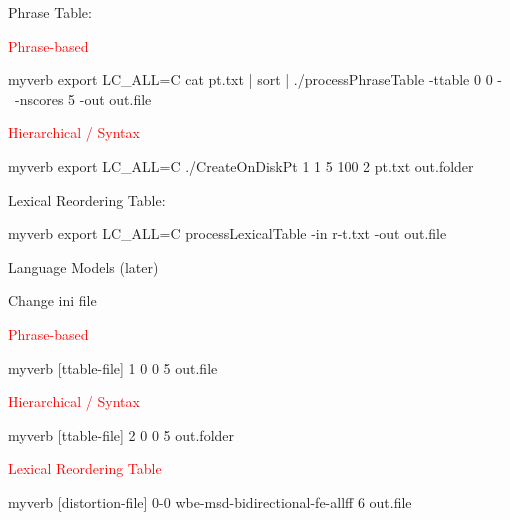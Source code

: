 \documentclass[landscape]{uedslides2C}
\begin{document}

 
Phrase Table:  
\begin{center}
\textcolor{red}{Phrase-based} \\
\begin{SaveVerbatim}{myverb} 
  export LC_ALL=C
  cat pt.txt | sort | ./processPhraseTable -ttable 0 0 -  \
      -nscores 5 -out out.file
\end{SaveVerbatim}
\colorbox{gray}{}
\end{center}

\begin{center}
\textcolor{red}{Hierarchical / Syntax} \\
\begin{SaveVerbatim}{myverb} 
  export LC_ALL=C
  ./CreateOnDiskPt 1 1 5 100 2 pt.txt out.folder
\end{SaveVerbatim}
\colorbox{gray}{}
\end{center}

Lexical Reordering Table:  
\begin{center}
\begin{SaveVerbatim}{myverb} 
  export LC_ALL=C
  processLexicalTable -in r-t.txt -out out.file
\end{SaveVerbatim}
\colorbox{gray}{}
\end{center}

Language Models (later)



Change ini file \\
\begin{center}
\textcolor{red}{Phrase-based} \\
\begin{SaveVerbatim}{myverb} 
[ttable-file]
1 0 0 5 out.file
\end{SaveVerbatim}
\colorbox{gray}{}

\textcolor{red}{Hierarchical / Syntax} \\
\begin{SaveVerbatim}{myverb} 
[ttable-file]
2 0 0 5 out.folder
\end{SaveVerbatim}
\colorbox{gray}{}

\textcolor{red}{Lexical Reordering Table} \\
\begin{SaveVerbatim}{myverb} 
[distortion-file]
0-0 wbe-msd-bidirectional-fe-allff 6 out.file
\end{SaveVerbatim}
\colorbox{gray}{}
\end{center}
\end{document}
